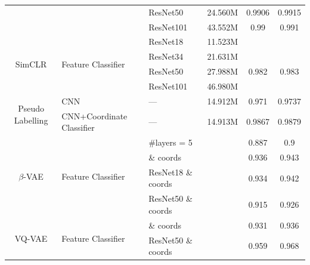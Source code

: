 \documentclass{article}
\begin{document}
\begin{table}[!htp]
\begin{tabular}{cllccc}
                                      &                                                  & ResNet50                    & 24.560M           & 0.9906            & 0.9915            \\
                                      &                                                  & ResNet101                   & 43.552M           & 0.99              & 0.991             \\ \cmidrule{1-6}
    \multirow{4}{*}{SimCLR}           & \multirow{4}{*}{Feature Classifier}              & ResNet18                    & 11.523M           &                   &                   \\
                                      &                                                  & ResNet34                    & 21.631M           &                   &                   \\
                                      &                                                  & ResNet50                    & 27.988M           & 0.982             & 0.983             \\
                                      &                                                  & ResNet101                   & 46.980M           &                   &                   \\ \cmidrule{1-6}
    \multirow{2}{*}{Pseudo Labelling} & CNN                                              & ---                         & 14.912M           & 0.971             & 0.9737            \\
                                      & CNN+Coordinate Classifier                        & ---                         & 14.913M           & 0.9867            & 0.9879            \\\cmidrule{1-6}
    \multirow{4}{*}{$\beta$-VAE}      & \multirow{4}{*}{Feature Classifier}              & \#layers = 5                &                   & 0.887             & 0.9               \\
                                      &                                                  & \& coords                   &                   & 0.936             & 0.943             \\
                                      &                                                  & ResNet18          \& coords &                   & 0.934             & 0.942             \\
                                      &                                                  & ResNet50          \& coords &                   & 0.915             & 0.926             \\ \cmidrule{1-6}
    \multirow{2}{*}{VQ-VAE}           & \multirow{2}{*}{Feature Classifier}              & \& coords                   &                   & 0.931             & 0.936             \\
                                      &                                                  & ResNet50          \& coords &                   & 0.959             & 0.968             \\ \midrule
    \bottomrule
  \end{tabular}
\end{table}
\end{document}
